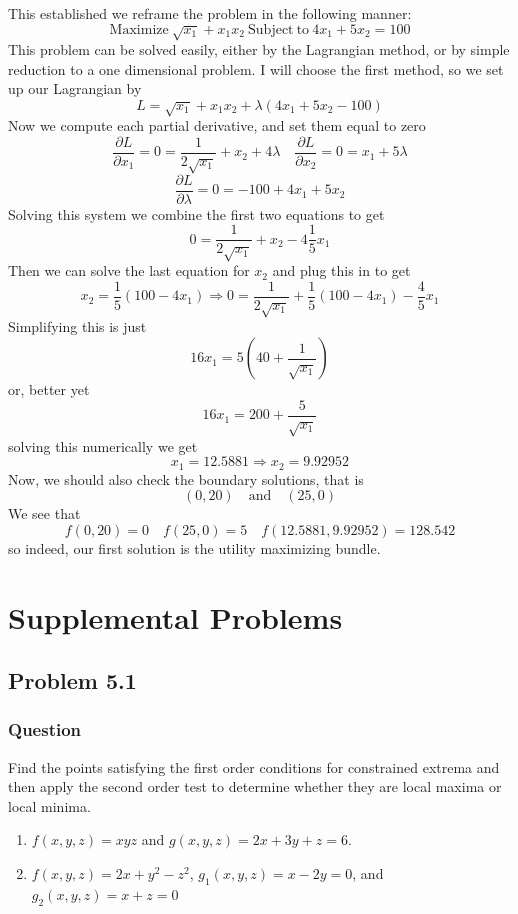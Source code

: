 \documentclass[12pt]{article}
\begin{document}
This established we reframe the problem in the following manner:
\[\mathrm{Maximize\ }\sqrt{x_1} +x_1 x_2 \ \mathrm{Subject\ to\ }4x_1+5x_2=100\]
This problem can be solved easily, either by the Lagrangian method, or by simple reduction to a one dimensional problem. I will choose the first method, so we set up our Lagrangian by 
\[L=\sqrt{x_1} +x_1 x_2+\lambda\left( 4x_1+5x_2-100 \right)\]
Now we compute each partial derivative, and set them equal to zero
\[\frac{\partial L}{\partial x_1} = 0 = \frac{1}{2 \sqrt{x_1}}+x_2+4 \lambda \quad \frac{\partial L}{\partial x_2} = 0 = x_1+5 \lambda   \]
\[\frac{\partial L}{\partial \lambda} = 0 = -100+4 x_1+5 x_2 \]
Solving this system we combine the first two equations to get 
\[  0 = \frac{1}{2 \sqrt{x_1}}+x_2-4 \frac{1}{5}x_1  \]
Then we can solve the last equation for $x_2$ and plug this in to get
\[x_2 = \frac{1}{5} \left( 100- 4 x_1 \right) \Rightarrow 0 = \frac{1}{2 \sqrt{x_1}}+ \frac{1}{5} \left( 100- 4 x_1 \right) -\frac{4}{5}x_1 \]
Simplifying this is just
\[16 x_1=5 \left(40+\frac{1}{\sqrt{x_1}}\right)\]
or, better yet
\[16 x_1=200+\frac{5}{\sqrt{x_1}}\]
solving this numerically we get
\[x_1= 12.5881 \Rightarrow x_2 = 9.92952 \]
Now, we should also check the boundary solutions, that is
\[(0,20)\quad\mathrm{and}\quad(25,0)\]
We see that
\[f(0,20)=0 \quad f(25,0)=5 \quad f(12.5881, 9.92952)=128.542\]
so indeed, our first solution is the utility maximizing bundle.


\section{Supplemental Problems}

\subsection{Problem 5.1}
\subsubsection{Question}
Find the points satisfying the first order conditions for constrained extrema and then apply the second order test to determine whether they are local maxima or local minima.
\begin{enumerate}
\item $f(x,y,z) = x y z$ and $g(x,y,z)=2 x+3 y+z =6$.
\item $f(x,y,z) = 2x + y^2 -z^2$, $g_1(x,y,z)=x-2y=0$, and $g_2(x,y,z)=x+z=0$
\end{enumerate}
\end{document}
